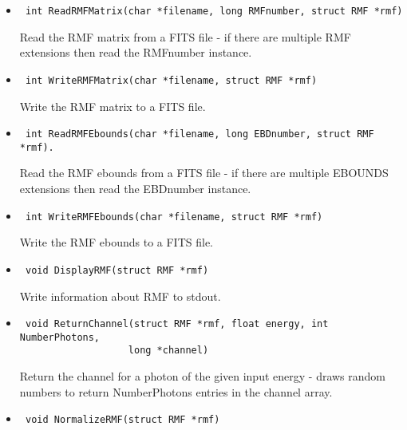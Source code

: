 \documentclass[11pt]{book}
\begin{document}
\begin{itemize}

\item      \begin{verbatim} int ReadRMFMatrix(char *filename, long RMFnumber, struct RMF *rmf)\end{verbatim}

               Read the RMF matrix from a FITS file - if there are 
               multiple RMF extensions then read the RMFnumber instance.

\item      \begin{verbatim} int WriteRMFMatrix(char *filename, struct RMF *rmf)\end{verbatim}

               Write the RMF matrix to a FITS file.

\item      \begin{verbatim} int ReadRMFEbounds(char *filename, long EBDnumber, struct RMF *rmf).\end{verbatim}

               Read the RMF ebounds from a FITS file - if there
               are multiple EBOUNDS extensions then read the EBDnumber instance.

\item      \begin{verbatim} int WriteRMFEbounds(char *filename, struct RMF *rmf)\end{verbatim}

               Write the RMF ebounds to a FITS file.

\item      \begin{verbatim} void DisplayRMF(struct RMF *rmf)\end{verbatim}

               Write information about RMF to stdout.

\item      \begin{verbatim} void ReturnChannel(struct RMF *rmf, float energy, int NumberPhotons, 
                   long *channel)\end{verbatim}
 
               Return the channel for a photon of the given input 
               energy - draws random numbers to return NumberPhotons 
               entries in the channel array.

\item      \begin{verbatim} void NormalizeRMF(struct RMF *rmf)\end{verbatim}


\end{itemize}
\end{document}
